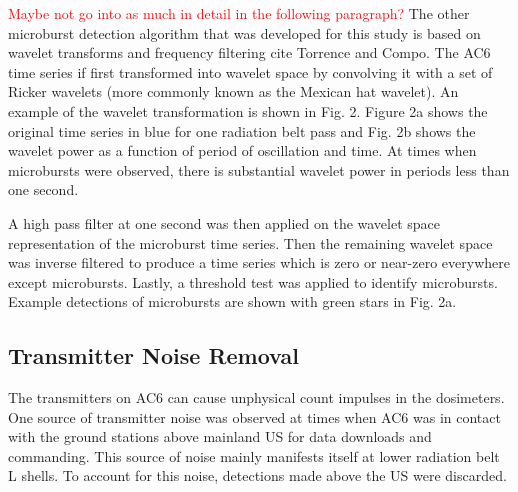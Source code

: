 \documentclass[draft]{agujournal2019}
\begin{document}
\textcolor{red}{Maybe not go into as much in detail in the following paragraph?} The other microburst detection algorithm that was developed for this study is based on wavelet transforms and frequency filtering cite Torrence and Compo. The AC6 time series if first transformed into wavelet space by convolving it with a set of Ricker wavelets (more commonly known as the Mexican hat wavelet). An example of the wavelet transformation is shown in Fig. 2. Figure 2a shows the original time series in blue for one radiation belt pass and Fig. 2b shows the wavelet power as a function of period of oscillation and time. At times when microbursts were observed, there is substantial wavelet power in periods less than one second.

A high pass filter at one second was then applied on the wavelet space representation of the microburst time series. Then the remaining wavelet space was inverse filtered to produce a time series which is zero or near-zero everywhere except microbursts. Lastly, a threshold test was applied to identify microbursts. Example detections of microbursts are shown with green stars in Fig. 2a.

\subsection{Transmitter Noise Removal}
The transmitters on AC6 can cause unphysical count impulses in the dosimeters. One source of transmitter noise was observed at times when AC6 was in contact with the ground stations above mainland US for data downloads and commanding. This source of noise mainly manifests itself at lower radiation belt L shells. To account for this noise, detections made above the US were discarded.
\end{document}
